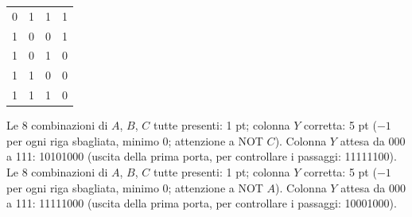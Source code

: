 \begin{esercizio}[6]
\begin{solution}
{{\begin{tabular}{ccc|c}
    0 & 1 & 1 & 1\\
    1 & 0 & 0 & 1\\
    1 & 0 & 1 & 0\\
    1 & 1 & 0 & 0\\
    1 & 1 & 1 & 0\\
  \end{tabular}}}
  \criterioRR
  {Le 8 combinazioni di $A$, $B$, $C$ tutte presenti: 1 pt; colonna $Y$ corretta: 5 pt ($-1$ per ogni riga sbagliata, minimo 0; attenzione a NOT $C$). Colonna $Y$ attesa da 000 a 111: 10101000 (uscita della prima porta, per controllare i passaggi: 11111100).}
  {Le 8 combinazioni di $A$, $B$, $C$ tutte presenti: 1 pt; colonna $Y$ corretta: 5 pt ($-1$ per ogni riga sbagliata, minimo 0; attenzione a NOT $A$). Colonna $Y$ attesa da 000 a 111: 11111000 (uscita della prima porta, per controllare i passaggi: 10001000).}
\end{solution}
\end{esercizio}
